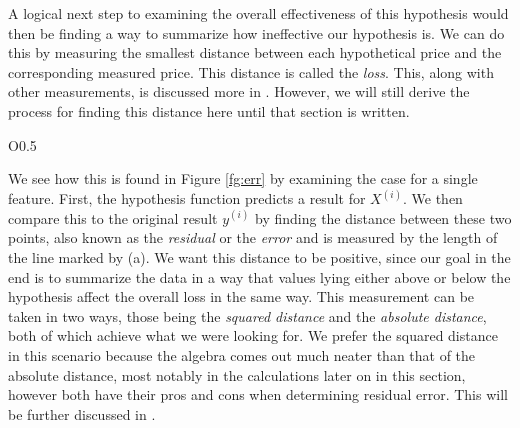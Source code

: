A logical next step to examining the overall effectiveness of this hypothesis would then be finding a way to summarize how ineffective our hypothesis is. We can do this by measuring the smallest distance between each hypothetical price and the corresponding measured price. This distance is called the \emph{loss}. This, along with other measurements,
is discussed more in \placeholder. However, we will still derive the process for
finding this distance here until that section is written.

\begin{wrapfigure}{O}{0.5\textwidth}
    \centering
    \caption{Visual representation of the distance between expected and actual
    results.}
    \label{fg:err}
\end{wrapfigure}

We see how this is found in Figure \ref{fg:err} by examining the case for a
single feature. First, the hypothesis function predicts a result for $X^{(i)}$.
We then compare this to the original result $y^{(i)}$ by finding the distance
between these two points, also known as the \emph{residual} or the \emph{error}
and is measured by the length of the line marked by (a). We want this distance to be positive, since our goal in the end is to summarize the data in a way that values lying either above or below the hypothesis affect the overall loss in the same way. This measurement can be taken in two ways, those being the \emph{squared distance} and the
\emph{absolute distance}, both of which achieve what we were looking for. We prefer
the squared distance in this scenario because the algebra comes out much neater
than that of the absolute distance, most notably in the calculations later on in
this section, however both have their pros and cons when determining residual
error. This will be further discussed in \placeholder.

